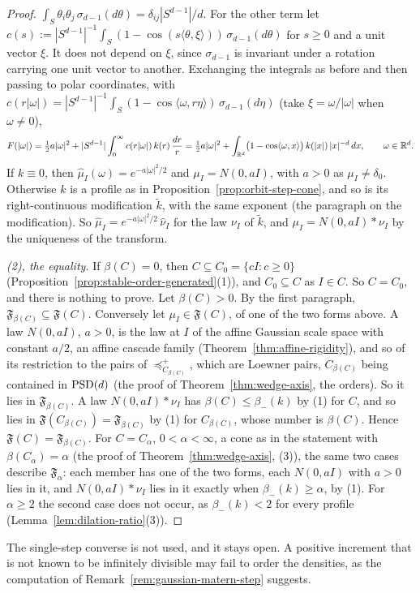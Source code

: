 \begin{proof}
$\int_S\theta_i\theta_j\,\sigma_{d-1}(d\theta) = \delta_{ij}|S^{d-1}|/d$. For the other term let
$c(s) := |S^{d-1}|^{-1}\int_S(1 - \cos(s\langle\theta,\xi\rangle))\,\sigma_{d-1}(d\theta)$ for $s \ge 0$ and a unit vector $\xi$. It does not depend on $\xi$, since $\sigma_{d-1}$ is invariant under a rotation carrying one unit vector to
another. Exchanging the integrals as before and then passing to polar coordinates, with
$c(r|\omega|) = |S^{d-1}|^{-1}\int_S(1 - \cos\langle\omega, r\eta\rangle)\,\sigma_{d-1}(d\eta)$ (take $\xi = \omega/|\omega|$
when $\omega \ne 0$),
\[
  F(|\omega|) = \tfrac12 a|\omega|^2 + |S^{d-1}|\int_0^\infty c(r|\omega|)\,k(r)\,\frac{dr}{r}
  = \tfrac12 a|\omega|^2 + \int_{\mathbb{R}^d}\bigl(1 - \cos\langle\omega,x\rangle\bigr)\,k(|x|)\,|x|^{-d}\,dx ,
  \qquad \omega \in \mathbb{R}^d .
\]
If $k \equiv 0$, then $\widehat\mu_I(\omega) = e^{-a|\omega|^2/2}$ and
$\mu_I = N(0, aI)$, with $a > 0$ as $\mu_I \ne \delta_0$. Otherwise $k$ is a profile as in
Proposition~\ref{prop:orbit-step-cone}, and so is its right-continuous modification $\tilde k$, with the same exponent (the paragraph
on the modification). So $\widehat\mu_I = e^{-a|\omega|^2/2}\,\widehat\nu_I$ for the law $\nu_I$ of $\tilde k$, and
$\mu_I = N(0, aI) * \nu_I$ by the uniqueness of the transform.

\emph{(2), the equality.} If $\beta(C) = 0$, then $C \subseteq C_0 = \{cI : c \ge 0\}$
(Proposition~\ref{prop:stable-order-generated}(1)), and $C_0 \subseteq C$ as $I \in C$. So $C = C_0$, and there is nothing to prove. Let $\beta(C) > 0$. By the first paragraph, $\mathfrak F_{\beta(C)} \subseteq \mathfrak F(C)$.
Conversely let $\mu_I \in \mathfrak F(C)$, of one of the two forms above. A law $N(0, aI)$, $a > 0$, is the law
at $I$ of the affine Gaussian scale space with constant $a/2$, an affine cascade family
(Theorem~\ref{thm:affine-rigidity}), and so of its restriction to the pairs of $\preceq^+_{C_{\beta(C)}}$, which are
Loewner pairs, $C_{\beta(C)}$ being contained in $\mathrm{PSD}(d)$ (the proof of Theorem~\ref{thm:wedge-axis}, the orders). So it lies in $\mathfrak F_{\beta(C)}$. A law $N(0, aI) * \nu_I$ has $\beta(C) \le \beta_-(k)$ by (1) for $C$, and so
lies in $\mathfrak F(C_{\beta(C)}) = \mathfrak F_{\beta(C)}$ by (1) for $C_{\beta(C)}$, whose number is $\beta(C)$. Hence
$\mathfrak F(C) = \mathfrak F_{\beta(C)}$. For $C = C_\alpha$, $0 < \alpha < \infty$, a cone as in the statement with
$\beta(C_\alpha) = \alpha$ (the proof of Theorem~\ref{thm:wedge-axis}, (3)), the same two cases describe
$\mathfrak F_\alpha$: each member has one of the two forms, each $N(0, aI)$ with $a > 0$ lies in it, and
$N(0, aI) * \nu_I$ lies in it exactly when $\beta_-(k) \ge \alpha$, by (1). For $\alpha \ge 2$ the second case does
not occur, as $\beta_-(k) < 2$ for every profile (Lemma~\ref{lem:dilation-ratio}(3)).
\end{proof}

The single-step converse is not used, and it stays open. A positive increment that is not known to be
infinitely divisible may fail to order the densities, as the computation of
Remark~\ref{rem:gaussian-matern-step} suggests.

